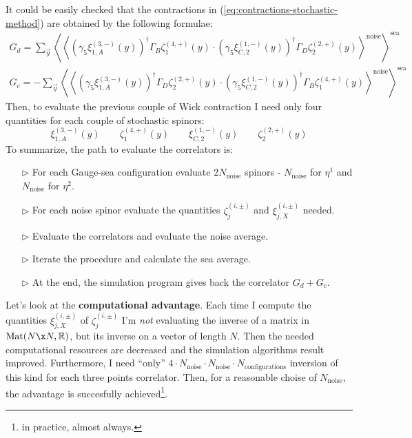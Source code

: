 \documentclass[english, LaM, oneside, noexaminfo]{sapthesis}
\begin{document}
It could be easily checked that the contractions in (\ref{eq:contractions-stochastic-method}) are obtained by the following formulae:
\begin{equation}\label{eq:noise-method}
    \begin{gathered}
        G_d =   \sum_{\vec y} \left\langle \left\langle \left(\gamma_5\xi^{(3,-)}_{1,A} (y) \right)^\dag \Gamma_B \zeta^{(4,+)}_1 (y) \cdot \left(\gamma_5\xi^{(1,-)}_{C,2} (y) \right)^\dag \Gamma_D \zeta^{(2,+)}_2 (y) \right\rangle^\text{noise} \right\rangle^{\text{sea}} \\
        G_c = - \sum_{\vec y} \left\langle \left\langle \left(\gamma_5\xi^{(3,-)}_{1,A} (y) \right)^\dag \Gamma_D \zeta^{(2,+)}_2 (y) \cdot \left(\gamma_5\xi^{(1,-)}_{C,2} (y) \right)^\dag \Gamma_B \zeta^{(4,+)}_1 (y) \right\rangle^\text{noise} \right\rangle^{\text{sea}}
    \end{gathered}
\end{equation}
Then, to evaluate the previous couple of Wick contraction I need only four quantities for each couple of stochastic spinors:
\begin{equation*}
    \xi^{(3,-)}_{1,A} (y) \qquad  \zeta^{(4,+)}_1 (y) \qquad \xi^{(1,-)}_{C,2} (y) \qquad  \zeta^{(2,+)}_2 (y)
\end{equation*}
To summarize, the path to evaluate the correlators is:
\begin{itemize}
    \item [$\triangleright$] For each Gauge-sea configuration evaluate 2$N_{\text{noise}}$ spinors - $N_{\text{noise}}$ for $\eta^1$ and $N_{\text{noise}}$ for $\eta^2$. 
    \item [$\triangleright$] For each noise spinor evaluate the quantities $\zeta^{(i,\pm)}_j$ and $\xi^{(i,\pm)}_{j,X}$ needed.
    \item [$\triangleright$] Evaluate the correlators and evaluate the noise average.
    \item [$\triangleright$] Iterate the procedure and calculate the sea average.
    \item [$\triangleright$] At the end, the simulation program gives back the correlator $G_d+G_c$.
\end{itemize}
Let's look at the {\bf computational advantage}.
Each time I compute the quantities $\xi^{(i,\pm)}_{j,X}$ of $\zeta^{(i,\pm)}_j$ I'm {\it not} evaluating the inverse of a matrix in $\text{Mat}(N\x N, \mathbb{R})$, but its inverse on a vector of length $N$.
Then the needed computational resources are decreased and the simulation algorithms result improved.
Furthermore, I need ``only'' $4\cdot N_\text{noise} \cdot N_\text{noise} \cdot N_\text{configurations} $ inversion of this kind for each three points correlator.
Then, for a reasonable choise of $N_\text{noise}$, the advantage is succesfully achieved\footnote{in practice, almost always.}.
\end{document}
